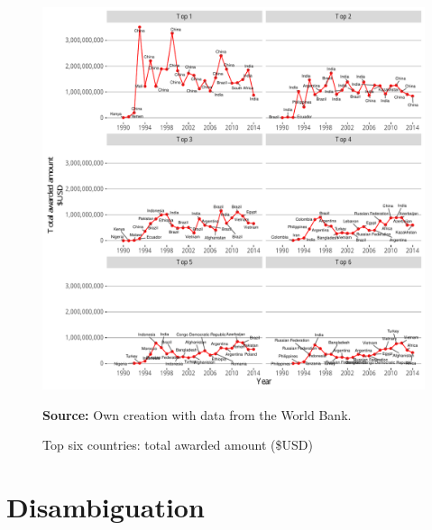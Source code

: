 \begin{figure}[H]
\begin{center}
\caption{Top six countries: total awarded amount (\$USD)}
\label{fig_major_awarded_usd_top}
\includegraphics[max width=.95\textwidth]{../img/major_historic_top_usd_awarded.pdf}
\end{center}
\noindent \footnotesize{\textbf{Source:} Own creation with data from the World Bank.}
\end{figure}






\section{Disambiguation}